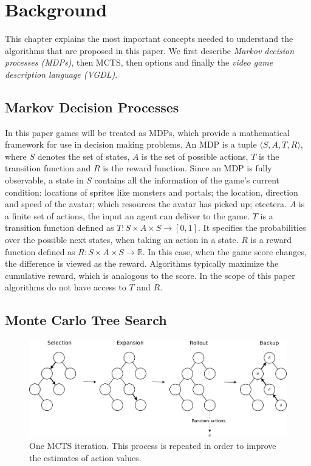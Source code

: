 \section{Background}
\label{sec:background}

This chapter explains the most important concepts needed to understand the
algorithms that are proposed in this paper. We first describe \emph{Markov
decision processes (MDPs)}, then  MCTS, then options and finally the \emph{video
game description language (VGDL)}.

\subsection{Markov Decision Processes}
\label{subsec:mdps}
In this paper games will be treated as MDPs, which provide a mathematical
framework for use in decision making problems. An MDP is a 
tuple $\langle S, A, T, R \rangle$, where $S$ denotes the set of states, $A$ is
the set of possible actions, $T$ is the transition function and $R$ is the
reward function. Since an MDP is fully observable, a state in $S$ contains all
the information of the game's current condition: locations of sprites like
monsters and portals; the location, direction and speed of the avatar; which
resources the avatar has picked up; etcetera. $A$ is a finite set of actions,
the input an agent can deliver to the game. $T$ is a transition function defined
as $T : S \times A \times S \rightarrow \left[0,1\right]$. It specifies the
probabilities over the possible next states, when taking an action in a state.
$R$ is a reward function defined as $R: S \times A \times S \rightarrow
\mathbb{R}$. In this case, when the game score changes, the difference is viewed
as the reward.  Algorithms typically maximize the cumulative reward, which is
analogous to the score. In the scope of this paper algorithms do not have access
to $T$ and $R$.

\subsection{Monte Carlo Tree Search}
\begin{figure}
	\centering
	\includegraphics[width=\columnwidth]{includes/mcts-wide-eps-converted-to}
	\caption{One MCTS iteration. This process is repeated in order to improve
	the estimates of action values.}
\label{fig:mcts}
\end{figure}

